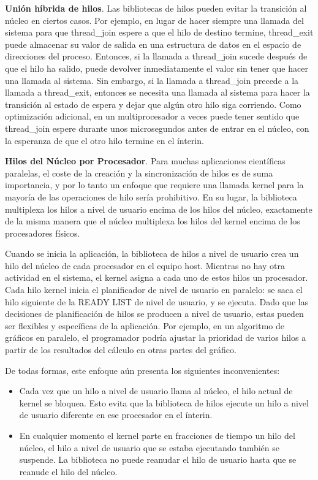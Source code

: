 \documentclass[10pt]{book}
\begin{document}
\textbf{Unión híbrida de hilos}. Las bibliotecas de hilos pueden evitar la transición al núcleo en ciertos casos. Por ejemplo, en lugar de hacer siempre una llamada del sistema para que {\mf thread\_join} espere a que el hilo de destino termine, {\mf thread\_exit} puede almacenar su valor de salida en una estructura de datos en el espacio de direcciones del proceso. Entonces, si la llamada a {\mf thread\_join} sucede después de que el hilo ha salido, puede devolver inmediatamente el valor sin tener que hacer una llamada al sistema. Sin embargo, si la llamada a {\mf thread\_join} precede a la llamada a {\mf thread\_exit}, entonces se necesita una llamada al sistema para hacer la transición al estado de espera y dejar que algún otro hilo siga corriendo. Como optimización adicional, en un multiprocesador a veces puede tener sentido que {\mf thread\_join} espere durante unos microsegundos antes de entrar en el núcleo, con la esperanza de que el otro hilo termine en el ínterin.

\textbf{Hilos del Núcleo por Procesador}. Para muchas aplicaciones científicas paralelas, el coste de la creación y la sincronización de hilos es de suma importancia, y por lo tanto un enfoque que requiere una llamada kernel para la mayoría de las operaciones de hilo sería prohibitivo. En su lugar, la biblioteca multiplexa los hilos a nivel de usuario encima de los hilos del núcleo, exactamente de la misma manera que el núcleo multiplexa los hilos del kernel encima de los procesadores físicos.

Cuando se inicia la aplicación, la biblioteca de hilos a nivel de usuario crea un hilo del núcleo de cada procesador en el equipo host. Mientras no hay otra actividad en el sistema, el kernel asigna a cada uno de estos hilos un procesador. Cada hilo kernel inicia el planificador de nivel de usuario en paralelo: se saca el hilo siguiente de la READY LIST de nivel de usuario, y se ejecuta. Dado que las decisiones de planificación de hilos se producen a nivel de usuario, estas pueden ser flexibles y específicas de la aplicación. Por ejemplo, en un algoritmo de gráficos en paralelo, el programador podría ajustar la prioridad de varios hilos a partir de los resultados del cálculo en otras partes del gráfico.

De todas formas, este enfoque aún presenta los siguientes inconvenientes:
\begin{itemize}
\item Cada vez que un hilo a nivel de usuario llama al núcleo, el hilo actual de kernel se bloquea. Esto evita que la biblioteca de hilos ejecute un hilo a nivel de usuario diferente en ese procesador en el ínterin.
\item En cualquier momento el kernel parte en fracciones de tiempo un hilo del núcleo, el hilo a nivel de usuario que se estaba ejecutando también se suspende. La biblioteca no puede reanudar el hilo de usuario hasta que se reanude el hilo del núcleo.
\end{itemize}
\end{document}
